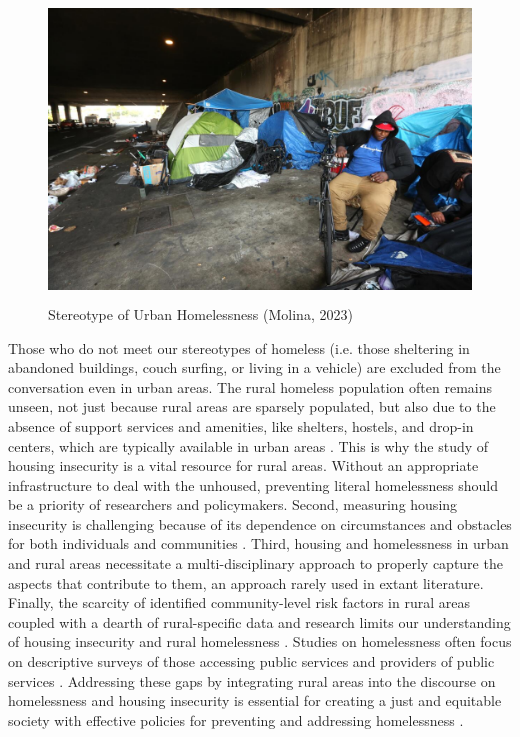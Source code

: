 \begin{figure}[htbp] 

    \centering 
    
    \includegraphics[width=\textwidth, height=8cm]{plots/homeless.jpeg} 
    
    \caption[Stereotype of Urban Homelessness]{Stereotype of Urban Homelessness (Molina, 2023)} 
    
    \label{fig:urban_homeless} 
    
\end{figure} 

\pagebreak

Those who do not meet our stereotypes of homeless (i.e. those sheltering in abandoned buildings, couch surfing, or living in a vehicle) are excluded from the conversation even in urban areas. The rural homeless population often remains unseen, not just because rural areas are sparsely populated, but also due to the absence of support services and amenities, like shelters, hostels, and drop-in centers, which are typically available in urban areas \citep{cloke_handbook_2006}. This is why the study of housing insecurity is a vital resource for rural areas. Without an appropriate infrastructure to deal with the unhoused, preventing literal homelessness should be a priority of researchers and policymakers. Second, measuring housing insecurity is challenging because of its dependence on circumstances and obstacles for both individuals and communities \citep{leifheit_building_2022}. Third, housing and homelessness in urban and rural areas necessitate a multi-disciplinary approach to properly capture the aspects that contribute to them, an approach rarely used in extant literature. Finally, the scarcity of identified community-level risk factors in rural areas coupled with a dearth of rural-specific data and research limits our understanding of housing insecurity and rural homelessness \citep{gleason_using_2021}. Studies on homelessness often focus on descriptive surveys of those accessing public services and providers of public services \citep{robertson_rural_2007}. Addressing these gaps by integrating rural areas into the discourse on homelessness and housing insecurity is essential for creating a just and equitable society with effective policies for preventing and addressing homelessness \citep{oregan_how_2021}. 

